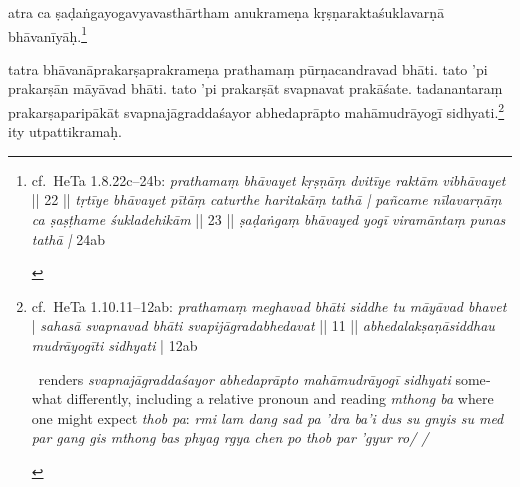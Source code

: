 \documentclass[naipra.tex]{subfiles}
\begin{document}
\begin{sanskrit}

\pstart
atra ca ṣaḍaṅgayogavyavasthārtham anukrameṇa kṛṣṇaraktaśuklavarṇā bhāvanīyāḥ.\footnote{
	\begin{english}%
		cf.\ HeTa 1.8.22c–24b: \emph{prathamaṃ bhāvayet kṛṣṇāṃ dvitīye raktām vibhāvayet} || 22 || \emph{tṛtīye bhāvayet pītāṃ caturthe haritakāṃ tathā | pañcame nīlavarṇāṃ ca ṣaṣṭhame śukladehikām }|| 23 || \emph{ṣaḍaṅgaṃ bhāvayed yogī viramāntaṃ punas tathā |} 24ab
	\end{english}
} 
\pend



\pstart
tatra bhāvanāprakarṣaprakrameṇa prathamaṃ pūrṇacandravad bhāti.
tato 'pi prakarṣān māyāvad bhāti.
tato 'pi prakarṣāt svapnavat prakāśate.
tadanantaraṃ prakarṣaparipākāt svapnajāgraddaśayor abhedaprāpto mahāmudrāyogī sidhyati.\footnote{
	\begin{english}%
		cf.\ HeTa 1.10.11–12ab: \emph{prathamaṃ meghavad bhāti siddhe tu māyāvad bhavet} | \emph{sahasā svapnavad bhāti svapijāgradabhedavat} || 11 || \emph{abhedalakṣaṇāsiddhau mudrāyogīti sidhyati} | 12ab

		\TIB\ renders \emph{svapnajāgraddaśayor abhedaprāpto mahāmudrāyogī sidhyati} somewhat differently, including a relative pronoun and reading \emph{mthong ba} where one might expect \emph{thob pa}: \emph{rmi lam dang sad pa 'dra ba'i dus su gnyis su med par gang gis mthong bas phyag rgya chen po thob par 'gyur ro/ /} 
	\end{english}
}
ity utpattikramaḥ. 
\pend




\end{sanskrit}
\end{document}
